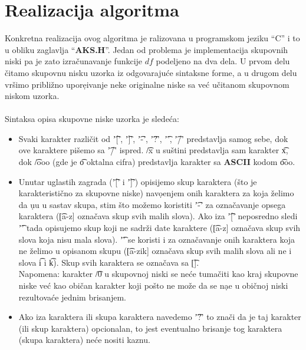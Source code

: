   \section{Realizacija algoritma}
    Konkretna realizacija ovog algoritma je ralizovana u programskom jeziku
    ``C'' i to u obliku zaglavlja ``{\bf AKS.H}''.
    Jedan od problema je implementacija skupo\-vnih niski pa je zato
    izra\v{c}unavanje funkcije $df$ podeljeno na dva dela.
    U prvom delu \v{c}itamo skupovnu nisku uzorka iz odgovaraju\'ce sintaksne
    forme, a u drugom delu vr\v{s}imo pribli\v{z}no upore{\d}ivanje neke
    originalne niske sa ve\'c u\v{c}itanom skupovnom niskom uzorka.\\
    \\
    Sintaksa opisa skupovne niske uzorka je slede\'ca:
    \begin{itemize}
      \item
        Svaki karakter razli\v{c}it od \t{'['}, \t{']'}, \t{'-'}, \t{'?'},
        \t{'\x'}, \t{'/'} predstavlja samog sebe, dok ove karaktere pi\v{s}emo
        sa \t{'/'} ispred.
        \t{/x} u su\v{s}tini predstavlja sam karakter \t{x}, dok \t{/ooo}
        (gde je \t{o} oktalna cifra) predstavlja karakter sa {\bf ASCII} kodom
        \t{ooo}.
      \item
        Unutar uglastih zagrada (\t{'['} i \t{']'}) opisijemo skup karaktera
        (\v{s}to je karakteristi\v{c}no za skupovne niske) navo{\d}enjem onih
        karaktera za koja \v{z}elimo da u{\d}u u sastav skupa, stim \v{s}to
        mo\v{z}emo koristiti \t{'-'} za ozna\v{c}a\-vanje opsega karaktera
        (\t{[a-z]} ozna\v{c}ava skup svih malih slova).
        Ako iza \t{'['} neposredno sledi \t{'\x'} tada opisujemo skup koji
        ne sadr\v{z}i date karaktere (\t{[{\x}a-z]} ozna\v{c}ava skup svih
        slova koja nisu mala slova).
        \t{'\x'} se koristi i za ozna\v{c}avanje onih karaktera koja ne
        \v{z}elimo u opisanom skupu (\t{[a-z{\x}ik]} ozna\v{c}ava skup svih
        malih slova ali ne i slova \t{i} i \t{k}).
        Skup svih karaktera se ozna\v{c}ava sa \t{[\x]}.\\
        Napomena: karakter \t{/0} u skupovnoj niski se ne\'ce tuma\v{c}iti kao
        kraj skupovne niske ve\'c kao obi\v{c}an karakter koji po\v{s}to ne
        mo\v{z}e da se na{\d}e u obi\v{c}noj niski rezultova\'ce jednim brisanjem.
      \item
        Ako iza karaktera ili skupa karaktera navedemo \t{'?'} to zna\v{c}i
        da je taj karakter (ili skup karaktera) opcionalan, to jest eventualno
        brisanje tog karaktera (skupa karaktera) ne\'ce nositi kaznu.
    \end{itemize}
